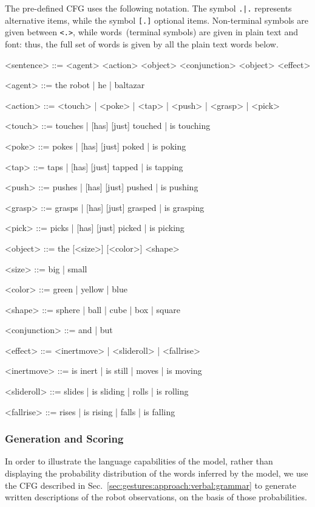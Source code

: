 The pre-defined \acl{CFG} uses the following notation.
The symbol \texttt{.|.} represents alternative items, while the symbol \texttt{[.]} optional items.
Non-terminal symbols are given between \texttt{<.>}, while words~(terminal symbols) are given in plain text and font: thus, the full set of words is given by all the plain text words below.

\begin{grammar}
  <sentence> ::= <agent> <action> <object> <conjunction> <object> <effect>

  <agent> ::= the robot | he | baltazar

  <action> ::= <touch> | <poke> | <tap> | <push> | <grasp> | <pick>

  <touch> ::= touches | [has] [just] touched | is touching

  <poke> ::= pokes | [has] [just] poked | is poking

  <tap> ::= taps | [has] [just] tapped | is tapping

  <push> ::= pushes | [has] [just] pushed | is pushing

  <grasp> ::= grasps | [has] [just] grasped | is grasping

  <pick> ::= picks | [has] [just] picked | is picking

  <object> ::= the [<size>] [<color>] <shape>

  <size> ::= big | small

  <color> ::= green | yellow | blue

  <shape> ::= sphere | ball | cube | box | square

  <conjunction> ::= and | but

  <effect> ::= <inertmove> | <slideroll> | <fallrise>

  <inertmove> ::= is inert | is still | moves | is moving

  <slideroll> ::= slides | is sliding | rolls | is rolling

  <fallrise> ::= rises | is rising | falls | is falling
\end{grammar}

\subsubsection{Generation and Scoring}
\label{sec:gestures:approach:verbal:descriptions}

In order to illustrate the language capabilities of the model, rather than displaying the probability distribution of the words inferred by the model, we use the \ac{CFG} described in Sec.~\ref{sec:gestures:approach:verbal:grammar} to generate written descriptions of the robot observations, on the basis of those probabilities.

